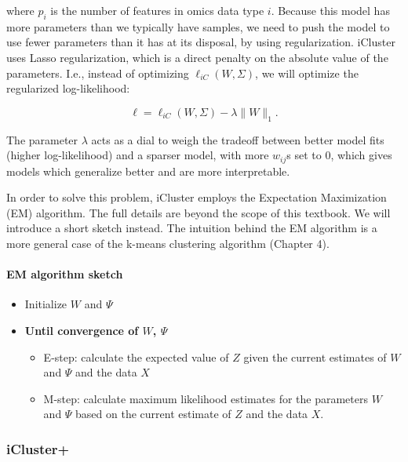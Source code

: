 \documentclass[12pt,]{krantz}
\providecommand{\tightlist}{%
  \setlength{\itemsep}{0pt}\setlength{\parskip}{0pt}}
\let\oldparagraph\paragraph
\renewcommand{\paragraph}[1]{\oldparagraph{#1}\mbox{}}
\begin{document}
where \(p_i\) is the number of features in omics data type \(i\). Because this model has more parameters than we typically have samples, we need to push the model to use fewer parameters than it has at its disposal, by using regularization. iCluster uses Lasso regularization, which is a direct penalty on the absolute value of the parameters. I.e., instead of optimizing \(\ell_{iC}(W,\Sigma)\), we will optimize the regularized log-likelihood:

\[
\ell = \ell_{iC}(W,\Sigma) - \lambda\|W\|_1.
\]

The parameter \(\lambda\) acts as a dial to weigh the tradeoff between better model fits (higher log-likelihood) and a sparser model, with more \(w_{ij}\)s set to \(0\), which gives models which generalize better and are more interpretable.

In order to solve this problem, iCluster employs the Expectation Maximization (EM) algorithm. The full details are beyond the scope of this textbook. We will introduce a short sketch instead. The intuition behind the EM algorithm is a more general case of the k-means clustering algorithm (Chapter 4).

\hypertarget{em-algorithm-sketch}{%
\paragraph{EM algorithm sketch}\label{em-algorithm-sketch}}

\begin{itemize}
\tightlist
\item
  Initialize \(W\) and \(\Psi\)
\item
  \textbf{Until convergence of \(W\), \(\Psi\)}

  \begin{itemize}
  \tightlist
  \item
    E-step: calculate the expected value of \(Z\) given the current estimates of \(W\) and \(\Psi\) and the data \(X\)
  \item
    M-step: calculate maximum likelihood estimates for the parameters \(W\) and \(\Psi\) based on the current estimate of \(Z\) and the data \(X\).
  \end{itemize}
\end{itemize}

\hypertarget{icluster-1}{%
\subsubsection{iCluster+}\label{icluster-1}}
\end{document}
